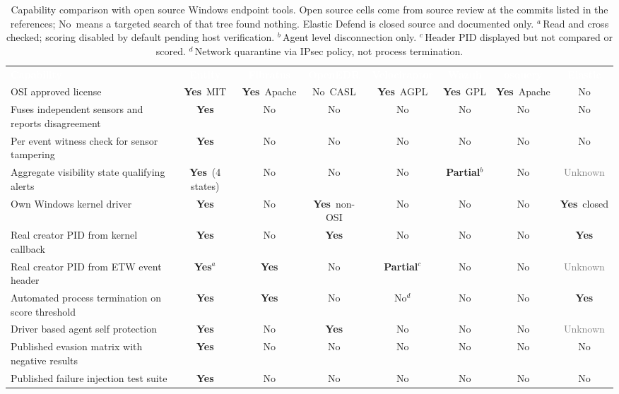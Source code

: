 \documentclass[10pt,twocolumn,letterpaper]{article}
\newcommand{\Thd}[1]{\textcolor{white}{\sffamily\bfseries #1}}
\newcommand{\Y}{\textcolor{YesGreen}{\textbf{Yes}}}
\newcommand{\N}{\textcolor{NoRed}{No}}
\newcommand{\Pt}{\textcolor{PartAmber}{\textbf{Partial}}}
\newcommand{\Unk}{\textcolor{gray}{Unknown}}
\newcommand{\headrow}{\rowcolor{TableHead}}
\begin{document}
\begin{table}[t]
\centering
\caption{Capability comparison with open source Windows endpoint tools. Open source cells
come from source review at the commits listed in the references; \N\ means a targeted
search of that tree found nothing. Elastic Defend is closed source and documented only.
$^{a}$\,Read and cross checked; scoring disabled by default pending host verification.
$^{b}$\,Agent level disconnection only. $^{c}$\,Header PID displayed but not compared
or scored. $^{d}$\,Network quarantine via IPsec policy, not process termination.}
\label{tbl:compare}
\small
\renewcommand{\arraystretch}{1.14}
\begin{tabularx}{\textwidth}{@{}>{\raggedright\arraybackslash}Xccccccc@{}}
\headrow \Thd{Capability} & \Thd{Entity} & \Thd{Fibratus} & \Thd{OpenEDR} &
  \Thd{Velociraptor} & \Thd{Wazuh} & \Thd{osquery} & \Thd{Elastic} \\
OSI approved license
  & \Y\ MIT & \Y\ Apache & \N\ CASL & \Y\ AGPL & \Y\ GPL & \Y\ Apache & \N \\
Fuses independent sensors and reports disagreement
  & \Y & \N & \N & \N & \N & \N & \N \\
Per event witness check for sensor tampering
  & \Y & \N & \N & \N & \N & \N & \N \\
Aggregate visibility state qualifying alerts
  & \Y\ (4 states) & \N & \N & \N & \Pt$^{b}$ & \N & \Unk \\
Own Windows kernel driver
  & \Y & \N & \Y\ non-OSI & \N & \N & \N & \Y\ closed \\
Real creator PID from kernel callback
  & \Y & \N & \Y & \N & \N & \N & \Y \\
Real creator PID from ETW event header
  & \Y$^{a}$ & \Y & \N & \Pt$^{c}$ & \N & \N & \Unk \\
Automated process termination on score threshold
  & \Y & \Y & \N & \N$^{d}$ & \N & \N & \Y \\
Driver based agent self protection
  & \Y & \N & \Y & \N & \N & \N & \Unk \\
Published evasion matrix with negative results
  & \Y & \N & \N & \N & \N & \N & \N \\
Published failure injection test suite
  & \Y & \N & \N & \N & \N & \N & \N \\
\bottomrule
\end{tabularx}
\end{table}

\end{document}
